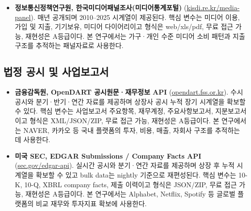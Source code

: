 \documentclass[11pt,a4paper]{report}
\begin{document}
\begin{itemize}[leftmargin=*, itemsep=0.6em]
  \item \textbf{정보통신정책연구원, 한국미디어패널조사(미디어통계포털)} (\href{https://stat.kisdi.re.kr/kor/contents/ContentsList.html}{kisdi.re.kr/media-panel}). 매년 공개되며 2010--2025 시계열이 제공된다. 핵심 변수는 미디어 이용, 가입 및 지출, 기기보유, 미디어 다이어리이고 형식은 web/xls/pdf, 무료 접근 가능, 재현성은 A등급이다. 본 연구에서는 가구·개인 수준 미디어 소비 패턴과 지출 구조를 추적하는 패널자료로 사용한다.
\end{itemize}

\subsection{법정 공시 및 사업보고서}
\begin{itemize}[leftmargin=*, itemsep=0.6em]
  \item \textbf{금융감독원, OpenDART 공시원문·재무정보 API} (\href{https://opendart.fss.or.kr/intro/main.do}{opendart.fss.or.kr}). 수시 공시와 분기·반기·연간 자료를 제공하며 상장사 공시 누적 장기 시계열을 확보할 수 있다. 핵심 변수는 사업보고서 주요항목, 재무계정, 주요사항보고서, 지분보고서이고 형식은 XML/JSON/ZIP, 무료 접근 가능, 재현성은 A등급이다. 본 연구에서는 NAVER, 카카오 등 국내 플랫폼의 투자, 비용, 매출, 자회사 구조를 추적하는 데 사용한다.
  \item \textbf{미국 SEC, EDGAR Submissions / Company Facts API} (\href{https://www.sec.gov/search-filings/edgar-application-programming-interfaces}{sec.gov/edgar-api}). 실시간 공시와 분기·연간 자료를 제공하며 상장 후 누적 시계열을 확보할 수 있고 bulk data는 nightly 기준으로 재편성된다. 핵심 변수는 10-K, 10-Q, XBRL company facts, 제출 이력이고 형식은 JSON/ZIP, 무료 접근 가능, 재현성은 A등급이다. 본 연구에서는 Alphabet, Netflix, Spotify 등 글로벌 플랫폼의 비교 재무와 투자지표 확보에 사용한다.
\end{itemize}
\end{document}

